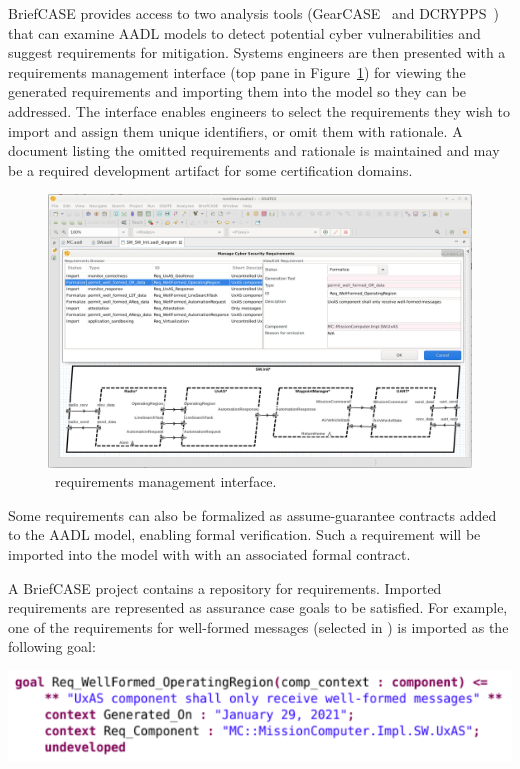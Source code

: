 BriefCASE provides access to two analysis tools (GearCASE~\cite{gearcase2020} and
DCRYPPS~\cite{dcrypps2019}) that can examine AADL models to detect potential cyber vulnerabilities
and suggest requirements for mitigation.
%
Systems engineers are then presented with a requirements management interface
(top pane in Figure~\ref{fig:req-mgmt}) for viewing the generated requirements and importing them into the model
so they can be addressed. The interface enables engineers to select the requirements they wish to
import and assign them unique identifiers, or omit them with rationale. A document listing the omitted
requirements and rationale is maintained and may be a required development artifact for some
certification domains. 

\begin{figure}[h]
	\centering
	\includegraphics[width=\textwidth]{figs/req-mgmt.png}
	\caption{\briefcase \ requirements management interface.} 
	\label{fig:req-mgmt} 
\end{figure}

Some requirements can also be formalized as assume-guarantee contracts
added to the AADL model, enabling formal verification. 
Such a requirement will be imported into the model with with an associated formal
contract.

A BriefCASE project contains a repository for requirements. Imported requirements are represented 
as assurance case goals to be satisfied. For example, one of the requirements for well-formed 
messages (selected in ) is imported as the following goal:

\noindent
\includegraphics[width=1\columnwidth]{figs/req-wellformed-or.png}

